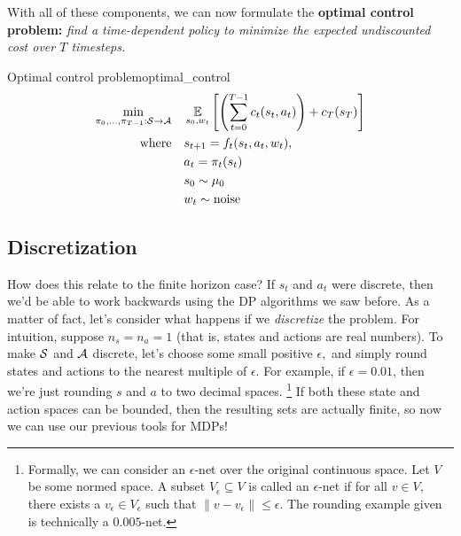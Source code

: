 \documentclass[../main/main]{subfiles}
\begin{document}
With all of these components, we can now formulate the \textbf{optimal control problem:} \emph{find a time-dependent policy to minimize the expected undiscounted cost over $T$ timesteps.}

\begin{definition}{Optimal control problem}{optimal_control}
    \begin{equation}
        \begin{split}
            \min_{\pi_0, \dots, \pi_{T-1} : \mathcal{S} \to \mathcal{A}} \quad & \operatorname*{\mathbb{E}}_{s_0, w_t} \left[
                \left( \sum_{t=0}^{T-1} c_t(s_t, a_t) \right) + c_T(s_T)
            \right] \\
            \text{where} \quad & s_{t+1} = f_t(s_t, a_t, w_t), \\
            & a_t = \pi_t(s_t) \\
            & s_0 \sim \mu_0 \\
            & w_t \sim \text{noise}
        \end{split}
    \end{equation}
\end{definition}


\subsection{Discretization}

How does this relate to the finite horizon case?
If $s_t$ and $a_t$ were discrete, then we'd be able to work backwards using
the DP algorithms we saw before.
As a matter of fact, let's consider what happens if we \emph{discretize} the
problem. For intuition, suppose $n_s = n_a = 1$ (that is, states and actions are real numbers).
To make $\mathcal{S}$ and $\mathcal{A}$ discrete, let's choose some small positive $\epsilon,$
and simply round states and actions to the nearest multiple of
$\epsilon.$ For example, if $\epsilon = 0.01$, then we're just rounding $s$ and $a$ to two decimal spaces. \footnote{Formally, we can consider an $\epsilon$-net over the original continuous space. Let $V$ be some normed space. A subset $V_\epsilon \subseteq V$ is called an $\epsilon$-net if for all $v \in V,$ there exists a $v_\epsilon \in V_\epsilon$ such that $\|v - v_\epsilon\| \le \epsilon.$ The rounding example given is technically a $0.005$-net.} If both these state and action spaces can be bounded, then the resulting sets are actually finite, so now we can use our previous tools for MDPs!
\end{document}
